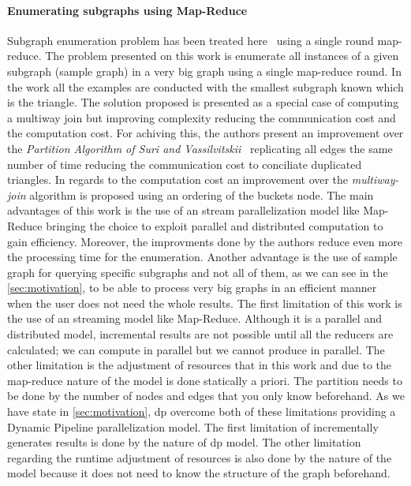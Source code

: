 \paragraph{Enumerating subgraphs using Map-Reduce} 
Subgraph enumeration problem has been treated here~\cite{enumeratingsg} using a single round map-reduce.
The problem presented on this work is enumerate all instances of a given subgraph (sample graph) in a very big graph using a single map-reduce round. 
In the work all the examples are conducted with the smallest subgraph known which is the triangle.
The solution proposed is presented as a special case of computing a multiway join but improving complexity reducing the communication cost and the computation cost.
For achiving this, the authors present an improvement over the \emph{Partition Algorithm of Suri and Vassilvitskii}~\cite{partitionalgo} replicating all edges the same number of time
reducing the communication cost to conciliate duplicated triangles. In regards to the computation cost an improvement over the \emph{multiway-join} algorithm is proposed using an ordering 
of the buckets node. The main advantages of this work is the use of an stream parallelization model like Map-Reduce bringing the choice to exploit parallel and distributed computation to gain efficiency. 
Moreover, the improvments done by the authors reduce even more the processing time for the enumeration. Another advantage is the use of sample graph for querying specific subgraphs and not all of them, 
as we can see in the \autoref{sec:motivation}, to be able to process very big graphs in an efficient manner when the user does not need the whole results.
The first limitation of this work is the use of an streaming model like Map-Reduce. Although it is a parallel and distributed model, incremental results are not possible until all the reducers are calculated; we can compute in parallel but we cannot produce in parallel.
The other limitation is the adjustment of resources that in this work and due to the map-reduce nature of the model is done statically a priori. The partition needs to be done by the number of nodes and edges that you only know beforehand.
As we have state in \autoref{sec:motivation}, \acrshort{dp} overcome both of these limitations providing a Dynamic Pipeline parallelization model. The first limitation of incrementally generates results is done by the nature of \acrshort{dp} model. 
The other limitation regarding the runtime adjustment of resources is also done by the nature of the model because it does not need to know the structure of the graph beforehand. 

